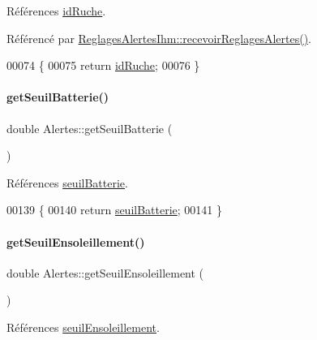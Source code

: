 Références \hyperlink{class_alertes_ae3f9d7aa34ab3c83a66c8484e2b89925}{id\+Ruche}.



Référencé par \hyperlink{class_reglages_alertes_ihm_a5c40f718b28b948a90574ef0c2d3e587}{Reglages\+Alertes\+Ihm\+::recevoir\+Reglages\+Alertes()}.


\begin{DoxyCode}
00074 \{
00075     \textcolor{keywordflow}{return} \hyperlink{class_alertes_ae3f9d7aa34ab3c83a66c8484e2b89925}{idRuche};
00076 \}
\end{DoxyCode}
\mbox{\label{class_alertes_adcf9f9fb707944ae17f2355819eb58d1}} 
\paragraph{\texorpdfstring{get\+Seuil\+Batterie()}{getSeuilBatterie()}}
{\footnotesize\ttfamily double Alertes\+::get\+Seuil\+Batterie (\begin{DoxyParamCaption}{ }\end{DoxyParamCaption})}



Références \hyperlink{class_alertes_a3ac4e5d2b1a8fdd9cf4633861948110f}{seuil\+Batterie}.


\begin{DoxyCode}
00139 \{
00140     \textcolor{keywordflow}{return} \hyperlink{class_alertes_a3ac4e5d2b1a8fdd9cf4633861948110f}{seuilBatterie};
00141 \}
\end{DoxyCode}
\mbox{\label{class_alertes_a54900058557979664d25137399ae2512}} 
\paragraph{\texorpdfstring{get\+Seuil\+Ensoleillement()}{getSeuilEnsoleillement()}}
{\footnotesize\ttfamily double Alertes\+::get\+Seuil\+Ensoleillement (\begin{DoxyParamCaption}{ }\end{DoxyParamCaption})}



Références \hyperlink{class_alertes_a7f512b6d3b5bc0851757ab4d18279ccf}{seuil\+Ensoleillement}.



